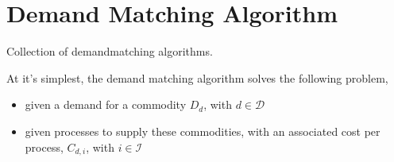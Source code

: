 \documentclass[letterpaper,10pt,english]{sphinxmanual}
\begin{document}
\section{Demand Matching Algorithm}
\label{\detokenize{api:module-muse.demand_matching}}\label{\detokenize{api:demand-matching-algorithm}}
Collection of demand\sphinxhyphen{}matching algorithms.

At it’s simplest, the demand matching algorithm solves the following problem,
\begin{itemize}
\item {} 
given a demand for a commodity \(D_d\), with \(d\in\mathcal{D}\)

\item {} 
given processes to supply these commodities, with an associated cost per process,
\(C_{d, i}\), with \(i\in\mathcal{I}\)

\end{itemize}
\end{document}
